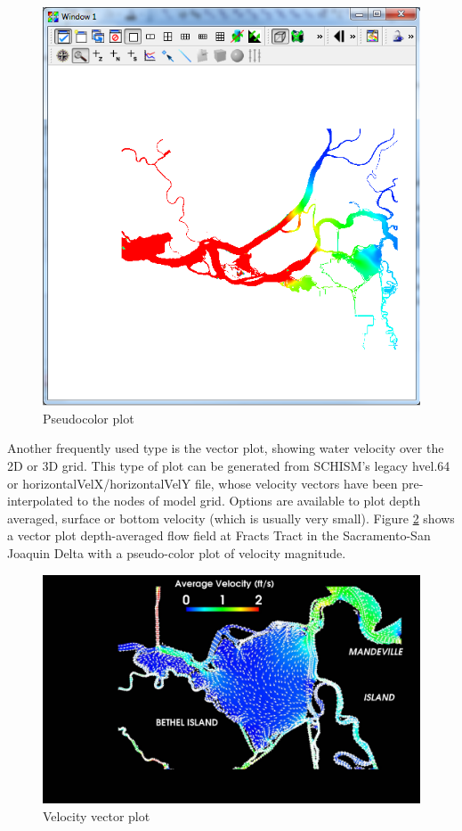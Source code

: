 \documentclass[12pt]{report}
\begin{document}
        \begin{figure}
        \includegraphics{colorPlot}
        \caption{Pseudocolor plot }
        \label{figure:colorSalt}
        \end{figure} 
				
			Another frequently used type is the vector plot, showing water velocity over the 2D or 3D grid. 
			This type of plot can be generated from SCHISM's  legacy hvel.64 or horizontalVelX/horizontalVelY file,
			whose velocity vectors have been pre-interpolated to the nodes of model grid. Options are available to plot 
			depth averaged, surface or bottom velocity (which is usually very small).
      Figure \ref{figure:fractVelVector} shows a vector plot depth-averaged flow field at Fracts Tract in the Sacramento-San Joaquin
			Delta with a pseudo-color plot of velocity magnitude.

        \begin{figure}
        \begin{center}
        \includegraphics[scale=0.2]{fractVelVector}
        \caption{Velocity vector plot }
        \label{figure:fractVelVector}
        \end{center}
        \end{figure} 
\end{document}
